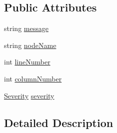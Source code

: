 \subsection*{Public Attributes}
\begin{DoxyCompactItemize}
\item 
string \hyperlink{a00069_ac7ed070dddd2613c08e7874ea5afb3af}{message}
\item 
string \hyperlink{a00069_a662aca4ad2af5116c2cf6773daf1a847}{node\-Name}
\item 
int \hyperlink{a00069_a0bd73f1c684bfd66ae7b6bef8f2972d0}{line\-Number}
\item 
int \hyperlink{a00069_a658e7fb05555c0f9ab5f80057bdc1408}{column\-Number}
\item 
\hyperlink{a00069_a227813cbc8fa03c3448a612ffc909d1c}{Severity} \hyperlink{a00069_ad90ffa839ce0f568a099bb37b4a6c4da}{severity}
\end{DoxyCompactItemize}


\subsection{Detailed Description}


